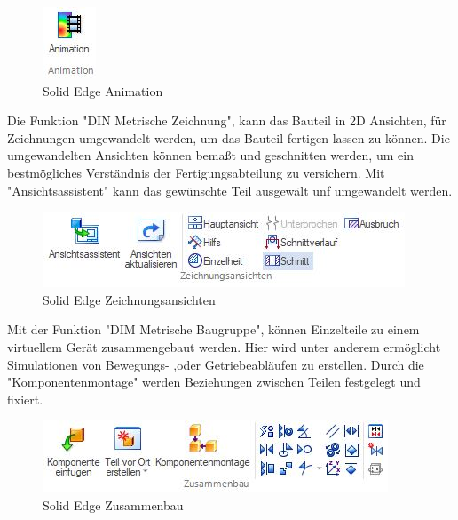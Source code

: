 \begin{figure} [H]
	\begin{center}
		\includegraphics[scale=0.4]{figures/mechanik/Solid Edge_Animation.jpg}
			\caption{Solid Edge Animation}
			\label{fig:Solid Edge Animation}
	\end{center}
\end{figure}


Die Funktion "DIN Metrische Zeichnung", kann das Bauteil in 2D Ansichten, für Zeichnungen umgewandelt werden, um das Bauteil fertigen lassen zu können. Die umgewandelten Ansichten können bemaßt und geschnitten werden, um ein bestmögliches Verständnis der Fertigungsabteilung zu versichern. Mit "Ansichtsassistent" kann das gewünschte Teil ausgewält unf umgewandelt werden.


\begin{figure} [H]
	\begin{center}
		\includegraphics[scale=0.4]{figures/mechanik/Solid Edge_Zeichnungsansichten.jpg}
			\caption{Solid Edge Zeichnungsansichten}
			\label{fig:Solid Edge Zeichnungsansichten}
	\end{center}
\end{figure}


Mit der Funktion "DIM Metrische Baugruppe", können Einzelteile zu einem virtuellem Gerät zusammengebaut werden. Hier wird unter anderem ermöglicht Simulationen von Bewegungs- ,oder Getriebeabläufen zu erstellen. Durch die "Komponentenmontage" werden Beziehungen zwischen Teilen festgelegt und fixiert.

\begin{figure} [H]
	\begin{center}
		\includegraphics[scale=0.5]{figures/mechanik/Solid Edge_Zusammenbau.jpg}
			\caption{Solid Edge Zusammenbau}
			\label{fig:Solid Edge Zusammenbau}
	\end{center}
\end{figure}
\newpage

